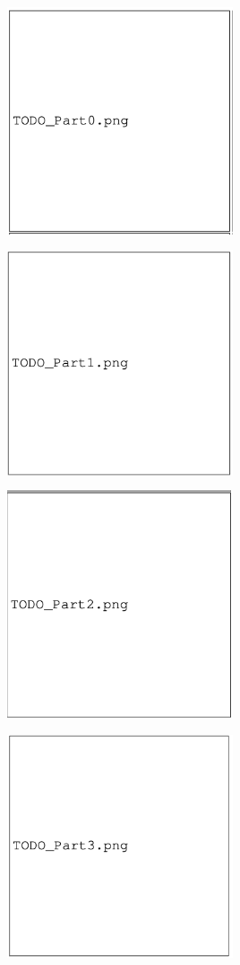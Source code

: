\documentclass[11pt]{article}
\begin{document}
\begin{tcolorbox}[colback=white!5!white,colframe=green!75!black]
\includegraphics[width=0.5\textwidth,height=7cm,keepaspectratio]{images/TODO_part0.png}
\includegraphics[width=0.5\textwidth,height=7cm,keepaspectratio]{images/TODO_part1.png}
\includegraphics[width=0.5\textwidth,height=7cm,keepaspectratio]{images/TODO_part2.png}
\includegraphics[width=0.5\textwidth,height=7cm,keepaspectratio]{images/TODO_part3.png}

\end{tcolorbox}
\end{document}

